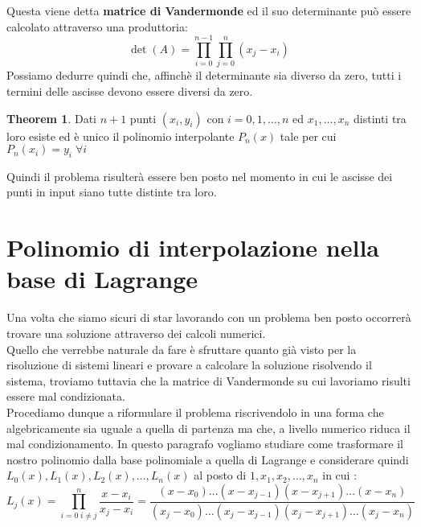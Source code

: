 \documentclass[12pt, a4paper]{book}
\theoremstyle{definition}
\newtheorem{theorem}{Theorem}
\begin{document}
\begin{flushleft}
Questa viene detta \textbf{matrice di Vandermonde} ed il suo determinante può essere calcolato attraverso una produttoria: 
\[ 
	\det(A) = \prod_{i = 0}^{n-1}\prod_{j = 0}^{n} (x_{j} - x_{i})
\]
Possiamo dedurre quindi che,  affinchè il determinante sia diverso da zero, tutti i termini delle ascisse devono essere diversi da zero. 

\begin{theorem}
	Dati $n+1$ punti $(x_{i}, y_{i})$ con $i = 0,1, \dots, n$ ed $x_{1}, \dots, x_{n}$ distinti tra loro esiste ed è unico il polinomio interpolante $P_{n}(x)$ tale per cui $P_{n}(x_{i}) = y_{i} \; \forall i$
\end{theorem}
Quindi il problema risulterà essere ben posto nel momento in cui le ascisse dei punti in input siano tutte distinte tra loro.
\end{flushleft}

\section{Polinomio di interpolazione nella base di Lagrange}
\begin{flushleft}
Una volta che siamo sicuri di star lavorando con un problema ben posto occorrerà trovare una soluzione attraverso dei calcoli numerici.\\
Quello che verrebbe naturale da fare è sfruttare quanto già visto per la risoluzione di sistemi lineari e provare a calcolare la soluzione risolvendo il sistema, troviamo tuttavia che la matrice di Vandermonde su cui lavoriamo risulti essere mal condizionata.\\
Procediamo dunque a riformulare il problema riscrivendolo in una forma che algebricamente sia uguale a quella di partenza ma che, a livello numerico riduca il mal condizionamento.
In questo paragrafo vogliamo studiare come trasformare il nostro polinomio dalla base polinomiale a quella di Lagrange e considerare quindi $L_{0}(x), L_{1}(x), L_{2}(x), \dots,L_{n}(x)$ al posto di $1, x_{1}, x_{2}, \dots,x_{n}$ in cui : 
\[
	L_{j}(x) = \prod_{i = 0 \; i \neq j}^{n} \frac{x-x_{i}}{x_{j}-x_{i}} = 
		\frac{(x-x_{0}) \dots (x-x_{j-1})(x-x_{j+1}) \dots (x-x_{n}) }{(x_{j}-x_{0}) \dots (x_{j}-x_{j-1}) (x_{j}-x_{j+1}) \dots (x_{j}-x_{n})}
\]
\end{flushleft}
\end{document}
